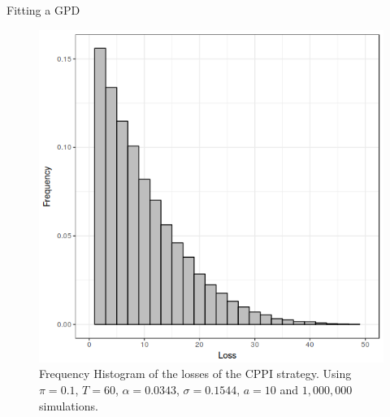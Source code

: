 \documentclass[10pt]{beamer}
\begin{document}
\begin{frame}[fragile]{Fitting a GPD}
  \begin{figure}[h]
    \centering
    \includegraphics[scale=0.45]{cppi-losses-hist.png}
    \caption{Frequency Histogram of the losses of the CPPI strategy. Using $\pi = 0.1$, $T=60$, $\alpha = 0.0343$, $\sigma = 0.1544$, $a=10$ and $1,000,000$ simulations.}
    \label{fig:cppi-losses-histogram}
  \end{figure}
\end{frame}
\end{document}
